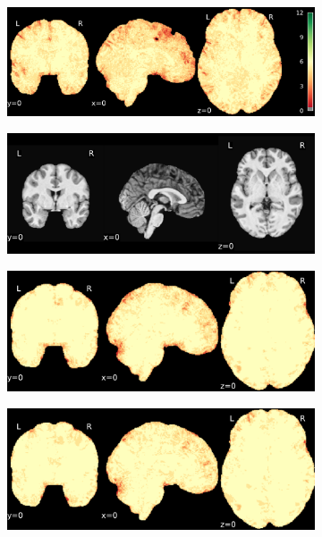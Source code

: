 \documentclass{article}
\begin{document}
\begin{landscape}
\begin{figure}
\begin{subfigure}[t]{0.2\paperheight}
        \end{subfigure}
        \begin{subfigure}[t]{0.2\paperheight}
            \centering
            \includegraphics[width=\textwidth]{figures/sig/ds001748_sub-adult15_rr.rs_sig.pdf}
        \end{subfigure}
        \begin{subfigure}[t]{0.2\paperheight}
            \centering
            \includegraphics[width=\textwidth]{figures/ieee_T1/ds001748_sub-adult16_ieee_mean.pdf}
        \end{subfigure}
        \begin{subfigure}[t]{0.2\paperheight}
            \centering
            \includegraphics[width=\textwidth]{figures/sig/ds001748_sub-adult16_rr_sig.pdf}
        \end{subfigure}
        \begin{subfigure}[t]{0.2\paperheight}
            \centering
            \includegraphics[width=\textwidth]{figures/sig/ds001748_sub-adult16_rs_sig.pdf}

\end{subfigure}
\end{figure}
\end{landscape}
\end{document}
